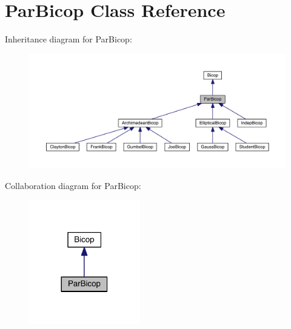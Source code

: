 \hypertarget{class_par_bicop}{}\section{Par\+Bicop Class Reference}
\label{class_par_bicop}


Inheritance diagram for Par\+Bicop\+:
\nopagebreak
\begin{figure}[H]
\begin{center}
\leavevmode
\includegraphics[width=350pt]{class_par_bicop__inherit__graph}
\end{center}
\end{figure}


Collaboration diagram for Par\+Bicop\+:
\nopagebreak
\begin{figure}[H]
\begin{center}
\leavevmode
\includegraphics[width=137pt]{class_par_bicop__coll__graph}
\end{center}
\end{figure}
